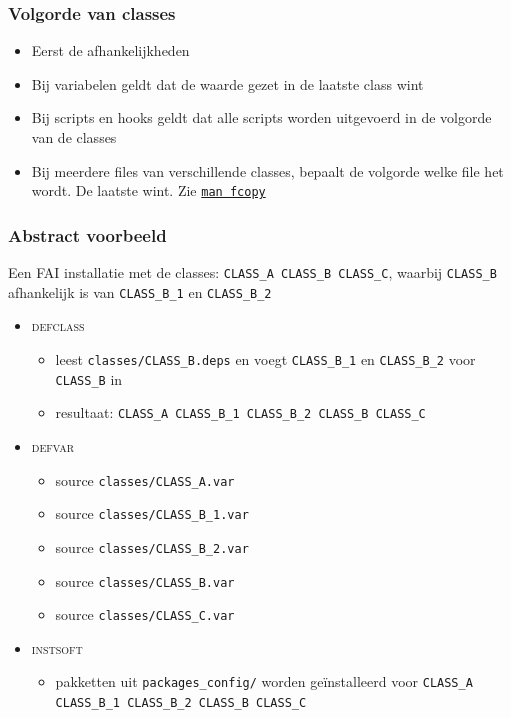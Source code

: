 \documentclass{beamer}
\begin{document}
\begin{frame}
\frametitle{Volgorde van classes}
\begin{itemize}
  \item<2-> Eerst de afhankelijkheden   
  \item<3-> Bij variabelen geldt dat de waarde gezet in de laatste class wint
  \item<4-> Bij scripts en hooks geldt dat alle scripts worden uitgevoerd in de volgorde van de classes
  \item<5-> Bij meerdere files van verschillende classes, bepaalt de volgorde welke file het wordt. De laatste wint. Zie \href{https://fai-project.org/doc/man/fcopy.html}{\texttt{man fcopy}}
\end{itemize}
\end{frame}

\begin{frame}
\frametitle{Abstract voorbeeld}
Een FAI installatie met de classes: \texttt{CLASS\_A CLASS\_B CLASS\_C}, waarbij \texttt{CLASS\_B} 
afhankelijk is van \texttt{CLASS\_B\_1} en \texttt{CLASS\_B\_2}

\begin{itemize}
  \item<2-> \textsc{defclass}
  \begin{itemize}
    \item leest \texttt{classes/CLASS\_B.deps} en voegt \texttt{CLASS\_B\_1} en \texttt{CLASS\_B\_2} voor \texttt{CLASS\_B} in
    \item resultaat: \texttt{CLASS\_A CLASS\_B\_1 CLASS\_B\_2 CLASS\_B CLASS\_C}
  \end{itemize}
  \item<3-> \textsc{defvar}
  \begin{itemize}
    \item source \texttt{classes/CLASS\_A.var}
    \item source \texttt{classes/CLASS\_B\_1.var}
    \item source \texttt{classes/CLASS\_B\_2.var}
    \item source \texttt{classes/CLASS\_B.var}
    \item source \texttt{classes/CLASS\_C.var}
  \end{itemize}
  \item<4-> \textsc{instsoft}
  \begin{itemize}
    \item pakketten uit \texttt{packages\_config/} worden ge\"{i}nstalleerd voor
     \texttt{CLASS\_A CLASS\_B\_1 CLASS\_B\_2 CLASS\_B CLASS\_C}
  \end{itemize}
\end{itemize}
\end{frame}
\end{document}
